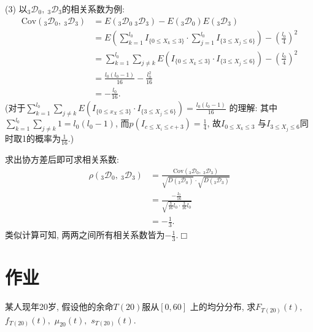 \documentclass[a4paper,openany, 10pt]{ctexbook}
\def\qed{\hfill$\Box$\medskip}
\def\z{\left}
\def\y{\right}
\begin{document}
\noindent(3) 以$_{3}\mathscr D _{0},\ _{3}\mathscr D _{3}$的相关系数为例:
\begin{align*}
    \text{Cov}(_{3}\mathscr D _{0},\ _{3}\mathscr D _{3}) & =E\z({}_{3}\mathscr D _{0}\ _{3}\mathscr D _{3}\y)-E(_{3}\mathscr D _{0})E(_{3}\mathscr D _{3})                                \\
                                                          & =E\z(\sum ^{l_{0}}_{k=1}I_{\{0\leq X_{k}\leq 3\}}\cdot \sum ^{l_{0}}_{j=1}I_{\{3\leq X_{j}\leq 6\}}\y)-\z(\frac{l_{0}}{4}\y)^{2} \\
                                                          & =\sum^{l_{0}}_{k=1}\sum_{j\neq k}E(I_{\{0\leq X_{k}\leq 3\}}\cdot I_{\{3\leq X_{j}\leq 6\}})-\z(\frac{ l_{0}}{4}\y)^{2}      \\
                                                          & =\frac{l_{0}(l_{0}-1)}{16}-\frac{l_{0}^{2}}{16}                                                                          \\
                                                          & =-\frac{l_{0}}{16}.
\end{align*}
(对于$\sum^{l_{0}}_{k=1}\sum_{j\neq k}E(I_{\{0\leq x_{X}\leq 3\}}\cdot I_{\{3\leq X_{j}\leq 6\}}) = \frac{l_{0}(l_{0}-1)}{16}$ 的理解: 其中$\sum^{l_{0}}_{k=1}\sum_{j\neq k}1 = l_0(l_0-1)$, 而$p(I_{c\leq X_{i}\leq c+3}) = \frac14$, 故$I_{0\leq X_{k}\leq 3}$ 与$I_{3\leq X_{j}\leq 6}$同时取1的概率为$\frac{1}{16}$.)

求出协方差后即可求相关系数:
\begin{align*}
    \rho(_{3}\mathscr D _{0},\ _{3}\mathscr D _{3}) & =\frac{\text{Cov}(_{3}\mathscr D_{0},\ _{3}\mathscr D _{3})}{\sqrt{D(_{3}\mathscr D _{0})}\cdot \sqrt{D(_{3}\mathscr D _{3})}} \\
                                                    & =\frac{-\frac{l_{0}}{16}}{\sqrt{\frac{3}{16}l_{0}\cdot \frac{3}{16}l_{0}}}                                                     \\
                                                    & =-\frac{1}{3}.
\end{align*}
类似计算可知, 两两之间所有相关系数皆为$-\frac{1}{3}$.\qed

\section{作业}
\begin{exs}
    某人现年20岁, 假设他的余命$T(20)$服从$[0,60]$ 上的均分分布, 求$F_{T(20)}(t),$ $ f_{T(20)}(t),$ $\mu_{20}(t),$ $s_{T(20)}(t).$
\end{exs}
\end{document}
